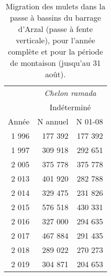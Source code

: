 \begin{table}[ht]
\centering
\begin{tabular}{rrr}
\toprule
  &\multicolumn{2}{c}{\textit{Chelon ramada}}  \\
						&\multicolumn{2}{c}{Indéterminé} \\ 
Année & N annuel & N 01-08 \\ 
  \midrule
1 996 & 177 392 & 177 392 \\ 
  1 997 & 309 918 & 292 651 \\ 
  2 005 & 375 778 & 375 778 \\ 
  2 013 & 401 920 & 282 788 \\ 
  2 014 & 329 475 & 231 826 \\ 
  2 015 & 576 518 & 430 331 \\ 
  2 016 & 327 000 & 294 635 \\ 
  2 017 & 467 884 & 291 435 \\ 
  2 018 & 289 022 & 270 273 \\ 
  2 019 & 304 871 & 204 653 \\ 
   \bottomrule
\end{tabular}
\caption{Migration des mulets dans la passe à bassins du barrage d'Arzal 
				(passe à fente verticale), pour l'année complète et pour la période de
				montaison (jusqu'au 31 août).}
\label{table_bilanannuel_mulets_0108}
\end{table}
